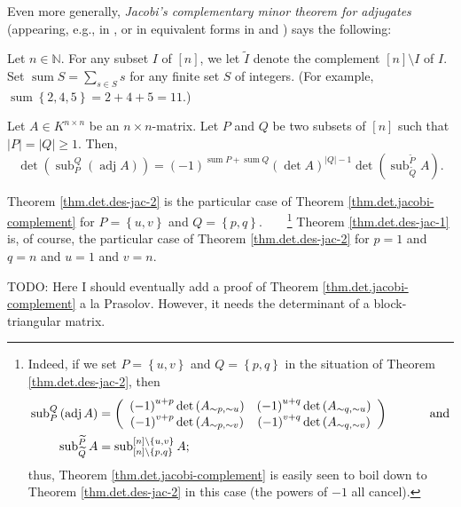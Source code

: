 Even more generally, \emph{Jacobi's complementary minor theorem for adjugates}
(appearing, e.g., in \cite[Theorem 5.22]{trach}, or in equivalent forms in
\cite[Theorem 2.5.2]{Prasolov} and \cite[(13)]{BruSch83}) says the following:

\begin{theorem}
%
\label{thm.det.jacobi-complement}Let $n\in\mathbb{N}$. For any subset $I$ of
$\left[  n\right]  $, we let $\widetilde{I}$ denote the complement $\left[
n\right]  \setminus I$ of $I$. Set $\operatorname*{sum}S=\sum_{s\in S}s$ for
any finite set $S$ of integers. (For example, $\operatorname*{sum}\left\{
2,4,5\right\}  =2+4+5=11$.)

Let $A\in K^{n\times n}$ be an $n\times n$-matrix. Let $P$ and $Q$ be two
subsets of $\left[  n\right]  $ such that $\left\vert P\right\vert =\left\vert
Q\right\vert \geq1$. Then,%
\[
\det\left(  \operatorname*{sub}\nolimits_{P}^{Q}\left(  \operatorname*{adj}%
A\right)  \right)  =\left(  -1\right)  ^{\operatorname*{sum}%
P+\operatorname*{sum}Q}\left(  \det A\right)  ^{\left\vert Q\right\vert
-1}\det\left(  \operatorname*{sub}\nolimits_{\widetilde{Q}}^{\widetilde{P}%
}A\right)  .
\]

\end{theorem}

Theorem \ref{thm.det.des-jac-2} is the particular case of Theorem
\ref{thm.det.jacobi-complement} for $P=\left\{  u,v\right\}  $ and $Q=\left\{
p,q\right\}  $.\ \ \ \ \footnote{Indeed, if we set $P=\left\{  u,v\right\}  $
and $Q=\left\{  p,q\right\}  $ in the situation of Theorem
\ref{thm.det.des-jac-2}, then%
\begin{align*}
\operatorname*{sub}\nolimits_{P}^{Q}\left(  \operatorname*{adj}A\right)   &
=\left(
\begin{array}
[c]{cc}%
\left(  -1\right)  ^{u+p}\det\left(  A_{\sim p,\sim u}\right)  & \left(
-1\right)  ^{u+q}\det\left(  A_{\sim q,\sim u}\right) \\
\left(  -1\right)  ^{v+p}\det\left(  A_{\sim p,\sim v}\right)  & \left(
-1\right)  ^{v+q}\det\left(  A_{\sim q,\sim v}\right)
\end{array}
\right)  \ \ \ \ \ \ \ \ \ \ \text{and}\\
\operatorname*{sub}\nolimits_{\widetilde{Q}}^{\widetilde{P}}A  &
=\operatorname*{sub}\nolimits_{\left[  n\right]  \setminus\left\{
p,q\right\}  }^{\left[  n\right]  \setminus\left\{  u,v\right\}  }A;
\end{align*}
thus, Theorem \ref{thm.det.jacobi-complement} is easily seen to boil down to
Theorem \ref{thm.det.des-jac-2} in this case (the powers of $-1$ all cancel).}
Theorem \ref{thm.det.des-jac-1} is, of course, the particular case of Theorem
\ref{thm.det.des-jac-2} for $p=1$ and $q=n$ and $u=1$ and $v=n$.

\begin{noncompile}
TODO: Here I should eventually add a proof of Theorem
\ref{thm.det.jacobi-complement} a la Prasolov. However, it needs the
determinant of a block-triangular matrix.
\end{noncompile}
